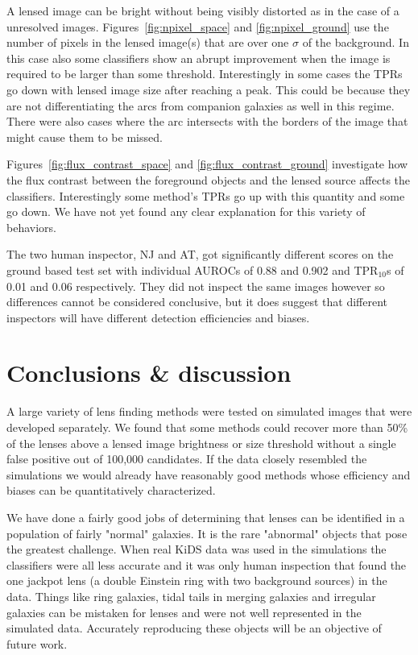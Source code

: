 \documentclass[useAMS,usenatbib]{mnras}
\newcommand{\red}[1]{{\color{red} #1}}
\begin{document}
A lensed image can be bright without being visibly distorted as in the case of a unresolved images.  Figures~\ref{fig:npixel_space} and \ref{fig:npixel_ground} use the number of pixels in the lensed image(s) that are over  one $\sigma$ of the background.  In this case also some classifiers show an abrupt improvement when the image is required to be larger than some threshold.  Interestingly in some cases the TPRs go down with lensed image size after reaching a peak.  This could be because they are not differentiating the arcs from companion galaxies as well in this regime.  There were also cases where the arc intersects with the borders of the image that might cause them to be missed.

Figures~\ref{fig:flux_contrast_space} and \ref{fig:flux_contrast_ground} investigate how the flux contrast between the foreground objects and the lensed source affects the classifiers.  Interestingly some method's TPRs go up with this quantity and some go down.  We have not yet found any clear explanation for this variety of behaviors.  

The two human inspector, NJ and AT, got significantly different scores on the ground based test set with individual AUROCs of 0.88 and 0.902 and TPR$_{10}$s of 0.01 and 0.06 respectively.  They did not inspect the same images however so differences cannot be considered conclusive, but it does suggest that different inspectors will have different detection efficiencies and biases.


\section{Conclusions \& discussion}
\label{sec:conclusion}

A large variety of lens finding methods were tested on simulated images that were developed separately.    We found that some methods could recover more than 50\% of the lenses above a lensed image brightness or size threshold without a single false positive out of 100,000 candidates.  If the data closely resembled the simulations we would already have reasonably good methods whose efficiency and biases can be quantitatively characterized.

We have done a fairly good jobs of determining that lenses can be identified in a population of fairly "normal" galaxies.  It is the rare "abnormal" objects that pose the greatest challenge.  When real KiDS data was used in the simulations the classifiers were all less accurate and it was only human inspection that found the one jackpot lens (a double Einstein ring with two background sources) in the data.  Things like ring galaxies, tidal tails in merging galaxies and irregular galaxies can be mistaken for lenses and were not well represented in the simulated data.  Accurately reproducing these objects will be an objective of future work.
\end{document}
